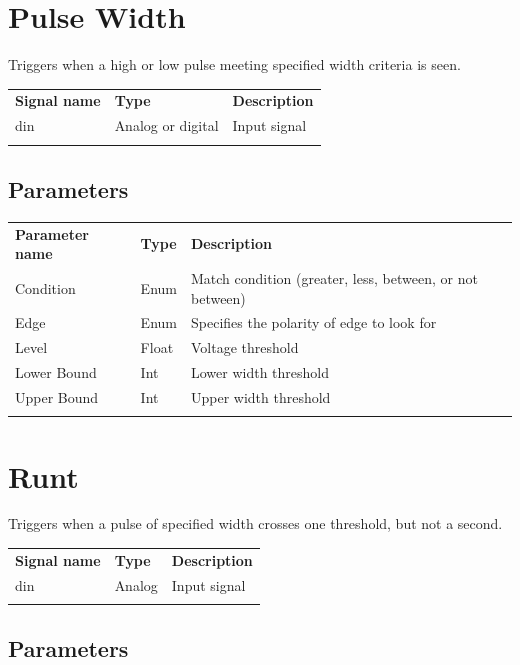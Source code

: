 \section{Pulse Width}

Triggers when a high or low pulse meeting specified width criteria is seen.

\begin{tabularx}{16cm}{llX}
\thickhline
\textbf{Signal name} & \textbf{Type} & \textbf{Description} \\
\thickhline
din & Analog or digital & Input signal \\
\thickhline
\end{tabularx}

\subsection{Parameters}

\begin{tabularx}{16cm}{llX}
\thickhline
\textbf{Parameter name} & \textbf{Type} & \textbf{Description} \\
\thickhline
Condition & Enum & Match condition (greater, less, between, or not between) \\
\thinhline
Edge & Enum & Specifies the polarity of edge to look for\\
\thinhline
Level & Float & Voltage threshold\\
\thinhline
Lower Bound & Int & Lower width threshold\\
\thinhline
Upper Bound & Int & Upper width threshold\\
\thickhline
\end{tabularx}

\section{Runt}

Triggers when a pulse of specified width crosses one threshold, but not a second.

\begin{tabularx}{16cm}{llX}
\thickhline
\textbf{Signal name} & \textbf{Type} & \textbf{Description} \\
\thickhline
din & Analog & Input signal \\
\thickhline
\end{tabularx}

\subsection{Parameters}

